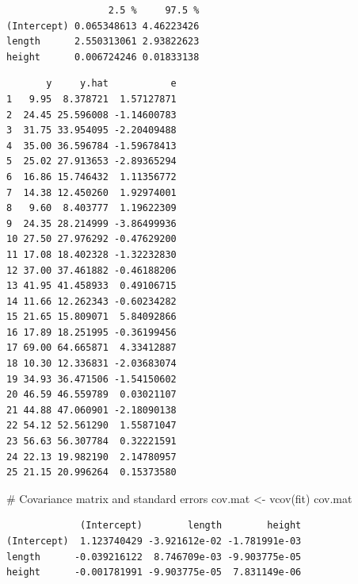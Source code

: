 \documentclass[
  letterpaper,
  DIV=11,
  numbers=noendperiod]{scrreprt}
\newenvironment{Shaded}{\begin{snugshade}}{\end{snugshade}}
\newcommand{\AttributeTok}[1]{\textcolor[rgb]{0.40,0.45,0.13}{#1}}
\newcommand{\CommentTok}[1]{\textcolor[rgb]{0.37,0.37,0.37}{#1}}
\newcommand{\FunctionTok}[1]{\textcolor[rgb]{0.28,0.35,0.67}{#1}}
\newcommand{\NormalTok}[1]{\textcolor[rgb]{0.00,0.23,0.31}{#1}}
\newcommand{\OtherTok}[1]{\textcolor[rgb]{0.00,0.23,0.31}{#1}}
\newcommand{\SpecialCharTok}[1]{\textcolor[rgb]{0.37,0.37,0.37}{#1}}
\begin{document}
\begin{verbatim}
                  2.5 %     97.5 %
(Intercept) 0.065348613 4.46223426
length      2.550313061 2.93822623
height      0.006724246 0.01833138
\end{verbatim}

\begin{Shaded}
\end{Shaded}

\begin{verbatim}
       y     y.hat           e
1   9.95  8.378721  1.57127871
2  24.45 25.596008 -1.14600783
3  31.75 33.954095 -2.20409488
4  35.00 36.596784 -1.59678413
5  25.02 27.913653 -2.89365294
6  16.86 15.746432  1.11356772
7  14.38 12.450260  1.92974001
8   9.60  8.403777  1.19622309
9  24.35 28.214999 -3.86499936
10 27.50 27.976292 -0.47629200
11 17.08 18.402328 -1.32232830
12 37.00 37.461882 -0.46188206
13 41.95 41.458933  0.49106715
14 11.66 12.262343 -0.60234282
15 21.65 15.809071  5.84092866
16 17.89 18.251995 -0.36199456
17 69.00 64.665871  4.33412887
18 10.30 12.336831 -2.03683074
19 34.93 36.471506 -1.54150602
20 46.59 46.559789  0.03021107
21 44.88 47.060901 -2.18090138
22 54.12 52.561290  1.55871047
23 56.63 56.307784  0.32221591
24 22.13 19.982190  2.14780957
25 21.15 20.996264  0.15373580
\end{verbatim}

\begin{Shaded}
\begin{Highlighting}[]
\CommentTok{\# Covariance matrix and standard errors}
\NormalTok{cov.mat }\OtherTok{\textless{}{-}} \FunctionTok{vcov}\NormalTok{(fit)}
\NormalTok{cov.mat}
\end{Highlighting}
\end{Shaded}

\begin{verbatim}
             (Intercept)        length        height
(Intercept)  1.123740429 -3.921612e-02 -1.781991e-03
length      -0.039216122  8.746709e-03 -9.903775e-05
height      -0.001781991 -9.903775e-05  7.831149e-06
\end{verbatim}
\end{document}
